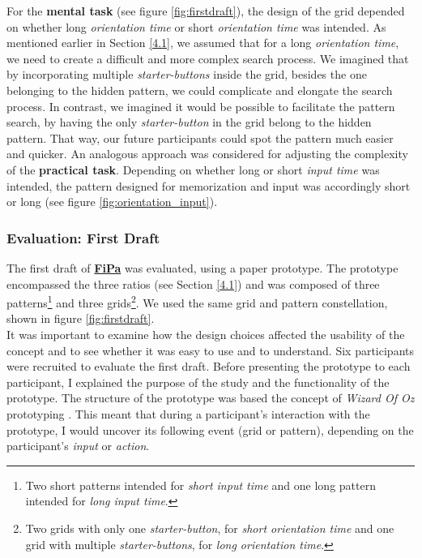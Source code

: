 For the \textbf{mental task} (see figure \ref{fig:firstdraft}), the design of the grid depended on whether long \textit{orientation time} or short \textit{orientation time} was intended. As mentioned earlier in Section \ref{4.1}, we assumed that for a long \textit{orientation time}, we need to create a difficult and more complex search process. We imagined that by incorporating multiple \textit{starter-buttons} inside the grid, besides the one belonging to the hidden pattern, we could complicate and elongate the search process. In contrast, we imagined it would be possible to facilitate the pattern search, by having the only \textit{starter-button} in the grid belong to the hidden pattern. That way, our future participants could spot the pattern much easier and quicker. An analogous approach was considered for adjusting the complexity of the \textbf{practical task}. Depending on whether long or short \textit{input time} was intended, the pattern designed for memorization and input was accordingly short or long (see figure \ref{fig:orientation_input}).

\subsubsection{Evaluation: First Draft} \label{4.2.2.2}

The first draft of \underline{\textbf{FiPa}} was evaluated, using a paper prototype. The prototype encompassed the three ratios (see Section \ref{4.1}) and was composed of three patterns\footnote{Two short patterns intended for \textit{short input time} and one long pattern intended for \textit{long input time}.} and three grids\footnote{Two grids with only one \textit{starter-button}, for \textit{short orientation time} and one grid with multiple \textit{starter-buttons}, for \textit{long orientation time}.}. We used the same grid and pattern constellation, shown in figure \ref{fig:firstdraft}.\\
It was important to examine how the design choices affected the usability of the concept and to see whether it was easy to use and to understand. Six participants were recruited to evaluate the first draft. Before presenting the prototype to each participant, I explained the purpose of the study and the functionality of the prototype. The structure of the prototype was based the concept of \textit{Wizard Of Oz} prototyping \cite{Butz2014}. This meant that during a participant's interaction with the prototype, I would uncover its  following event (grid or pattern), depending on the participant's \textit{input} or \textit{action}.\\

